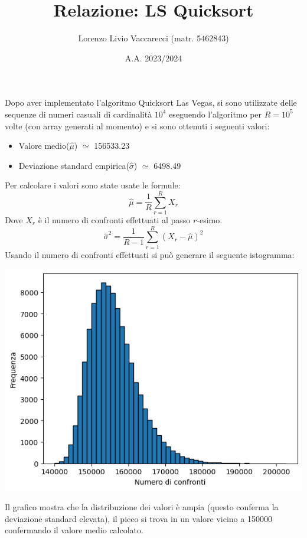\documentclass[12pt]{article}
\title{Relazione: LS Quicksort}
\author{Lorenzo Livio Vaccarecci (matr. 5462843)}
\date{A.A. 2023/2024}
\begin{document}
\maketitle
Dopo aver implementato l'algoritmo Quicksort Las Vegas, 
si sono utilizzate delle sequenze di numeri casuali di 
cardinalità $10^{4}$ eseguendo l'algoritmo per $R=10^{5}$ 
volte (con array generati al momento) e si sono ottenuti i seguenti valori:
\begin{itemize}
    \item Valore medio($\hat{\mu}$) $\simeq $ 156533.23
    \item Deviazione standard empirica($\hat{\sigma}$) $\simeq$ 6498.49
\end{itemize}
Per calcolare i valori sono state usate le formule:
\begin{equation*}
    \hat{\mu} = \frac{1}{R}\sum_{r=1}^{R}X_{r} 
\end{equation*}
Dove $X_{r}$ è il numero di confronti effettuati al passo $r$-esimo.
\begin{equation*}
    \hat{\sigma}^{2} = \frac{1}{R-1}\sum_{r=1}^{R}(X_{r}-\hat{\mu})^{2}
\end{equation*}
Usando il numero di confronti effettuati si può generare il seguente 
istogramma:
\begin{center}
    \includegraphics[scale=0.8]{Istogramma.png}
\end{center}
Il grafico mostra che la distribuzione dei valori è ampia (questo 
conferma la deviazione standard elevata), il picco si trova in un 
valore vicino a 150000 confermando il valore medio calcolato.\\
\end{document}
